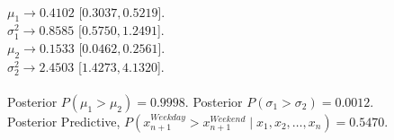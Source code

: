 \documentclass{article}
\begin{document}
\\
$\mu_1 \rightarrow 0.4102$ [$0.3037,0.5219$].\\
$\sigma_1^2 \rightarrow  0.8585$ [$0.5750,1.2491$].\\
$\mu_2 \rightarrow  0.1533$ [$0.0462,0.2561$].\\
$\sigma_2^2 \rightarrow 2.4503$ [$1.4273,4.1320$].\\

\\
Posterior $P(\mu_1 > \mu_2) = 0.9998.$ Posterior $P(\sigma_1 > \sigma_2) =  0.0012.$\\
Posterior Predictive, $P(x_{n+1}^{Weekday} > x_{n+1}^{Weekend} \mid x_1,x_2,\ldots,x_n) =  0.5470.$\\

\pagebreak
{}\\

\end{document}
